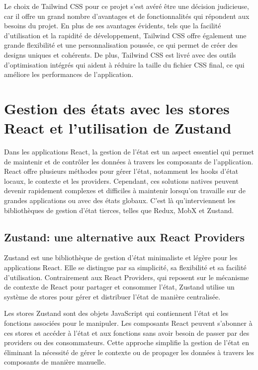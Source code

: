 Le choix de Tailwind CSS pour ce projet s'est avéré être une décision judicieuse, car il offre un grand nombre d'avantages et de fonctionnalités qui répondent aux besoins du projet. En plus de ses avantages évidents, tels que la facilité d'utilisation et la rapidité de développement, Tailwind CSS offre également une grande flexibilité et une personnalisation poussée, ce qui permet de créer des designs uniques et cohérents. De plus, Tailwind CSS est livré avec des outils d'optimisation intégrés qui aident à réduire la taille du fichier CSS final, ce qui améliore les performances de l'application.

\section{Gestion des états avec les stores React et l'utilisation de Zustand}

Dans les applications React, la gestion de l'état est un aspect essentiel qui permet de maintenir et de contrôler les données à travers les composants de l'application. React offre plusieurs méthodes pour gérer l'état, notamment les hooks d'état locaux, le contexte et les providers. Cependant, ces solutions natives peuvent devenir rapidement complexes et difficiles à maintenir lorsqu'on travaille sur de grandes applications ou avec des états globaux. C'est là qu'interviennent les bibliothèques de gestion d'état tierces, telles que Redux, MobX et Zustand.

\subsection{Zustand: une alternative aux React Providers}

Zustand\cite{Zustand2023} est une bibliothèque de gestion d'état minimaliste et légère pour les applications React. Elle se distingue par sa simplicité, sa flexibilité et sa facilité d'utilisation. Contrairement aux React Providers, qui reposent sur le mécanisme de contexte de React pour partager et consommer l'état, Zustand utilise un système de stores pour gérer et distribuer l'état de manière centralisée.

Les stores Zustand sont des objets JavaScript qui contiennent l'état et les fonctions associées pour le manipuler. Les composants React peuvent s'abonner à ces stores et accéder à l'état et aux fonctions sans avoir besoin de passer par des providers ou des consommateurs. Cette approche simplifie la gestion de l'état en éliminant la nécessité de gérer le contexte ou de propager les données à travers les composants de manière manuelle.

